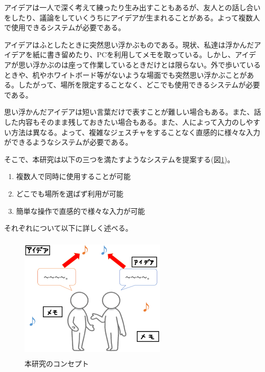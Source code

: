 \documentclass[11pt,a4j, titlepage]{jarticle} %
\begin{document}
アイデアは一人で深く考えて練ったり生み出すこともあるが、友人との話し合いをしたり、議論をしていくうちにアイデアが生まれることがある。よって複数人で使用できるシステムが必要である。

アイデアはふとしたときに突然思い浮かぶものである。現状、私達は浮かんだアイデアを紙に書き留めたり、PCを利用してメモを取っている。しかし、アイデアが思い浮かぶのは座って作業しているときだけとは限らない。外で歩いているときや、机やホワイトボード等がないような場面でも突然思い浮かぶことがある。したがって、場所を限定することなく、どこでも使用できるシステムが必要である。

思い浮かんだアイデアは短い言葉だけで表すことが難しい場合もある。また、話した内容もそのまま残しておきたい場合もある。また、人によって入力のしやすい方法は異なる。よって、複雑なジェスチャをすることなく直感的に様々な入力ができるようなシステムが必要である。

そこで、本研究は以下の三つを満たすようなシステムを提案する(図\ref{fig:concept})。

\begin{enumerate}[(1)]
 \item 複数人で同時に使用することが可能
 \item どこでも場所を選ばず利用が可能
 \item 簡単な操作で直感的で様々な入力が可能
\end{enumerate}

それぞれについて以下に詳しく述べる。

\begin{figure}[H]
  \begin{center}
    \includegraphics[clip,height=6.0cm,width=7.0cm]{./concept.eps}
    \caption{本研究のコンセプト}
    \label{fig:concept}
  \end{center}
\end{figure}
\end{document}

